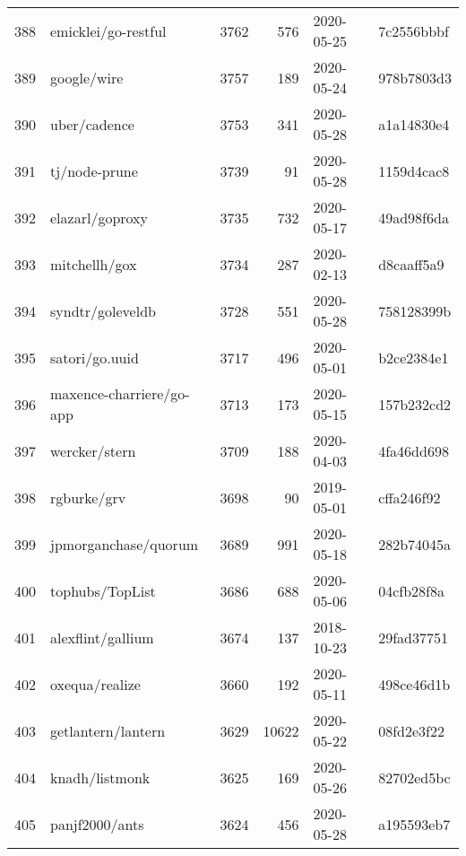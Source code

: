 \begin{longtable}{llrrll}
    388 &                                emicklei/go-restful &   3762 &    576 & 2020-05-25 &  7c2556bbbf \\
    389 &                                        google/wire &   3757 &    189 & 2020-05-24 &  978b7803d3 \\
    390 &                                       uber/cadence &   3753 &    341 & 2020-05-28 &  a1a14830e4 \\
    391 &                                      tj/node-prune &   3739 &     91 & 2020-05-28 &  1159d4cac8 \\
    392 &                                    elazarl/goproxy &   3735 &    732 & 2020-05-17 &  49ad98f6da \\
    393 &                                      mitchellh/gox &   3734 &    287 & 2020-02-13 &  d8caaff5a9 \\
    394 &                                   syndtr/goleveldb &   3728 &    551 & 2020-05-28 &  758128399b \\
    395 &                                     satori/go.uuid &   3717 &    496 & 2020-05-01 &  b2ce2384e1 \\
    396 &                           maxence-charriere/go-app &   3713 &    173 & 2020-05-15 &  157b232cd2 \\
    397 &                                      wercker/stern &   3709 &    188 & 2020-04-03 &  4fa46dd698 \\
    398 &                                        rgburke/grv &   3698 &     90 & 2019-05-01 &  cffa246f92 \\
    399 &                               jpmorganchase/quorum &   3689 &    991 & 2020-05-18 &  282b74045a \\
    400 &                                    tophubs/TopList &   3686 &    688 & 2020-05-06 &  04cfb28f8a \\
    401 &                                  alexflint/gallium &   3674 &    137 & 2018-10-23 &  29fad37751 \\
    402 &                                     oxequa/realize &   3660 &    192 & 2020-05-11 &  498ce46d1b \\
    403 &                                 getlantern/lantern &   3629 &  10622 & 2020-05-22 &  08fd2e3f22 \\
    404 &                                     knadh/listmonk &   3625 &    169 & 2020-05-26 &  82702ed5bc \\
    405 &                                     panjf2000/ants &   3624 &    456 & 2020-05-28 &  a195593eb7 \\

\end{longtable}
